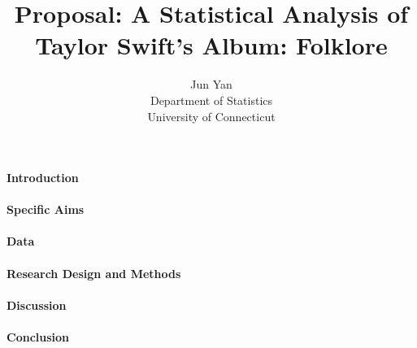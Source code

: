 \documentclass[12pt]{article}
\title{Proposal: A Statistical Analysis of Taylor Swift's Album: Folklore}
\author{Jun Yan\\
  Department of Statistics\\
  University of Connecticut
}
\begin{document}
\maketitle


\paragraph{Introduction}
\citep{dwivedi2017analysis}

\paragraph{Specific Aims}


\paragraph{Data}


\paragraph{Research Design and Methods}


\paragraph{Discussion}
\citep{wild2004global}

\paragraph{Conclusion}





\end{document}
